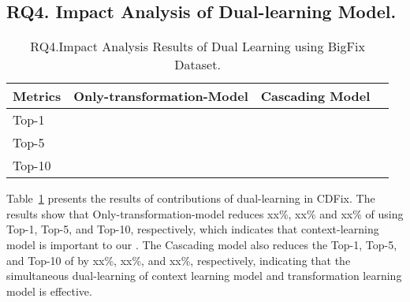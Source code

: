 \subsection{\bf RQ4. Impact Analysis of Dual-learning Model.}



\begin{table}[t]
	\caption{RQ4.Impact Analysis Results of Dual Learning using BigFix Dataset.}
	{\small
		\begin{center}
			\renewcommand{\arraystretch}{1}
			\begin{tabular}{p{1cm}<{\centering}|p{2.7cm}<{\centering}|p{1.7cm}<{\centering}|p{1cm}<{\centering}}
				\hline
				Metrics & Only-transformation-Model & Cascading Model &  \tool \\			
				\hline
				Top-1   &  &  &  \\ \hline
				Top-5	&  &  & \\ \hline
				Top-10	&  &  & \\ \hline
			
				\hline
			\end{tabular}
			
			\label{fig:rq4_results}
		\end{center}
	}
\end{table}


Table~\ref{fig:rq4_results} presents the results of contributions of dual-learning in CDFix. The results show that Only-transformation-model reduces xx\%, xx\% and xx\% of {\tool} using Top-1, Top-5, and Top-10, respectively, which indicates that context-learning model is important to our {\tool}. The Cascading model also reduces the Top-1, Top-5, and Top-10 of {\tool} by xx\%, xx\%, and xx\%, respectively, indicating that the simultaneous dual-learning of context learning model and transformation learning model is effective.  